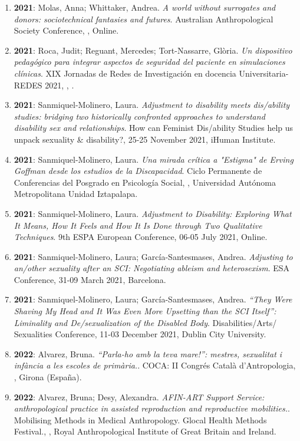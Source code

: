 \begin{enumerate}
\item {\bf 2021}: Molas, Anna; Whittaker, Andrea. {\it A world without surrogates and donors: sociotechnical fantasies and futures}. Australian Anthropological Society Conference, , Online.\filbreak
\item {\bf 2021}: Roca, Judit; Reguant, Mercedes; Tort-Nassarre, Glòria. {\it Un dispositivo pedagógico para integrar aspectos de seguridad del paciente en simulaciones clínicas}. XIX Jornadas de Redes de Investigación en docencia Universitaria-REDES 2021, , .\filbreak
\item {\bf 2021}: Sanmiquel-Molinero, Laura. {\it Adjustment to disability meets dis/ability studies: bridging two historically confronted approaches to understand disability sex and relationships}. How can Feminist Dis/ability Studies help us unpack sexuality \& disability?, 25-25 November 2021, iHuman Institute.\filbreak
\item {\bf 2021}: Sanmiquel-Molinero, Laura. {\it Una mirada crítica a "Estigma" de Erving Goffman desde los estudios de la Discapacidad}. Ciclo Permanente de Conferencias del Posgrado en Psicología Social, , Universidad Autónoma Metropolitana Unidad Iztapalapa.\filbreak
\item {\bf 2021}: Sanmiquel-Molinero, Laura. {\it Adjustment to Disability: Exploring What It Means, How It Feels and How It Is Done through Two Qualitative Techniques}. 9th ESPA European Conference, 06-05 July 2021, Online.\filbreak
\item {\bf 2021}: Sanmiquel-Molinero, Laura; García-Santesmases, Andrea. {\it Adjusting to an/other sexuality after an SCI: Negotiating ableism and heterosexism}. ESA Conference, 31-09 March 2021, Barcelona.\filbreak
\item {\bf 2021}: Sanmiquel-Molinero, Laura; García-Santesmases, Andrea. {\it “They Were Shaving My Head and It Was Even More Upsetting than the SCI Itself”: Liminality and De/sexualization of the Disabled Body}. Disabilities/Arts/ Sexualities Conference, 11-03 December 2021, Dublin City University.\filbreak
\item {\bf 2022}: Alvarez, Bruna. {\it “Parla-ho amb la teva mare!”: mestres, sexualitat i infància a les escoles de primària.}. COCA: II Congrés Català d’Antropologia, , Girona (España).\filbreak
\item {\bf 2022}: Alvarez, Bruna; Desy, Alexandra. {\it AFIN-ART Support Service: anthropological practice in assisted reproduction and reproductive mobilities.}. Mobilising Methods in Medical Anthropology. Glocal Health Methods Festival., , Royal Anthropological Institute of Great Britain and Ireland.\filbreak

\end{enumerate}

